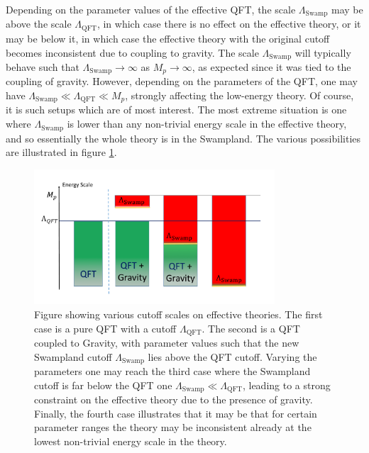 \documentclass[11pt,a4paper]{article}
\numberwithin{equation}{section}
\numberwithin{table}{section}\setlength{\multlinegap}{25pt}
\begin{document}
Depending on the parameter values of the effective QFT, the scale $\Lambda_{\mathrm{Swamp}}$ may be above the scale $\Lambda_{\mathrm{QFT}}$, in which case there is no effect on the effective theory, or it may be below it, in which case the effective theory with the original cutoff becomes inconsistent due to coupling to gravity. The scale $\Lambda_{\mathrm{Swamp}}$ will typically behave such that $\Lambda_{\mathrm{Swamp}} \rightarrow \infty$ as $M_p \rightarrow \infty$, as expected since it was tied to the coupling of gravity. However, depending on the parameters of the QFT, one may have $\Lambda_{\mathrm{Swamp}} \ll \Lambda_{\mathrm{QFT}} \ll M_p$, strongly affecting the low-energy theory. Of course, it is such setups which are of most interest. The most extreme situation is one where $\Lambda_{\mathrm{Swamp}}$ is lower than any non-trivial energy scale in the effective theory, and so essentially the whole theory is in the Swampland. The various possibilities are illustrated in figure \ref{fig:swgen}. 
\begin{figure}[t]
\centering
 \includegraphics[width=0.8\textwidth]{SwCo2.pdf}
\caption{Figure showing various cutoff scales on effective theories. The first case is a pure QFT with a cutoff $\Lambda_{\mathrm{QFT}}$. The second is a QFT coupled to Gravity, with parameter values such that the new Swampland cutoff $\Lambda_{\mathrm{Swamp}}$ lies above the QFT cutoff. Varying the parameters one may reach the third case where the Swampland cutoff is far below the QFT one $\Lambda_{\mathrm{Swamp}} \ll \Lambda_{\mathrm{QFT}}$, leading to a strong constraint on the effective theory due to the presence of gravity. Finally, the fourth case illustrates that it may be that for certain parameter ranges the theory may be inconsistent already at the lowest non-trivial energy scale in the theory.}
\label{fig:swgen}
\end{figure}
\end{document}
